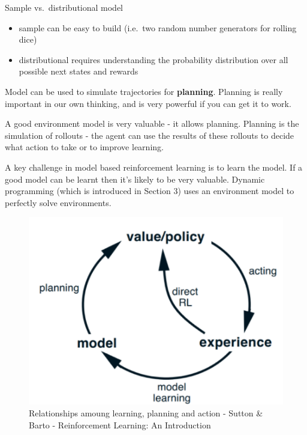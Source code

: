 \documentclass[]{article}
\providecommand{\tightlist}{%
  \setlength{\itemsep}{0pt}\setlength{\parskip}{0pt}}
\begin{document}
Sample vs.~distributional model

\begin{itemize}
\tightlist
\item
  sample can be easy to build (i.e.~two random number generators for
  rolling dice)
\item
  distributional requires understanding the probability distribution
  over all possible next states and rewards
\end{itemize}

Model can be used to simulate trajectories for \textbf{planning}.
Planning is really important in our own thinking, and is very powerful
if you can get it to work.

A good environment model is very valuable - it allows planning. Planning
is the simulation of rollouts - the agent can use the results of these
rollouts to decide what action to take or to improve learning.

A key challenge in model based reinforcement learning is to learn the
model. If a good model can be learnt then it's likely to be very
valuable. Dynamic programming (which is introduced in Section 3) uses an
environment model to perfectly solve environments.

\begin{figure}
\centering
\includegraphics[width=\textwidth,height=0.3\textheight]{./tex2pdf.-4c1708fb449e9e84/7ef01ac31f42757acbd4ebba9ecb26d67dd6ae46.png}
\caption{Relationships amoung learning, planning and action - Sutton \&
Barto - Reinforcement Learning: An Introduction}
\end{figure}
\end{document}
